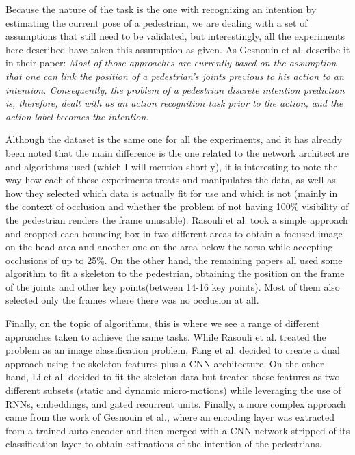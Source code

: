 \documentclass[journal,letterpaper]{IEEEtran}
\begin{document}
Because the nature of the task is the one with recognizing an intention by estimating the current pose of a pedestrian, we are dealing with a set of assumptions that still need to be validated, but interestingly, all the experiments here described have taken this assumption as given.  As Gesnouin et al. describe it in their paper: \emph{Most of those approaches are currently based on the assumption that one can link the position of a pedestrian's joints previous to his action to an intention. Consequently, the problem of a pedestrian discrete intention prediction is, therefore, dealt with as an action recognition task prior to the action, and the action label becomes the intention}.

Although the dataset is the same one for all the experiments, and it has already been noted that the main difference is the one related to the network architecture and algorithms used (which I will mention shortly), it is interesting to note the way how each of these experiments treats and manipulates the data, as well as how they selected which data is actually fit for use and which is not (mainly in the context of occlusion and whether the problem of not having 100\% visibility of the pedestrian renders the frame unusable). Rasouli et al. \cite{rasouli2017ICCVW} took a simple approach and cropped each bounding box in two different areas to obtain a focused image on the head area and another one on the area below the torso while accepting occlusions of up to 25\%. On the other hand, the remaining papers all used some algorithm to fit a skeleton to the pedestrian, obtaining the position on the frame of the joints and other key points(between 14-16 key points). Most of them also selected only the frames where there was no occlusion at all.

Finally, on the topic of algorithms, this is where we see a range of different approaches taken to achieve the same tasks. While Rasouli et al. treated the problem as an image classification problem, Fang et al. decided to create a dual approach using the skeleton features plus a CNN architecture. On the other hand, Li et al. decided to fit the skeleton data but treated these features as two different subsets (static and dynamic micro-motions) while leveraging the use of RNNs, embeddings, and gated recurrent units. Finally, a more complex approach came from the work of Gesnouin et al., where an encoding layer was extracted from a trained auto-encoder and then merged with a CNN network stripped of its classification layer to obtain estimations of the intention of the pedestrians.
\end{document}
